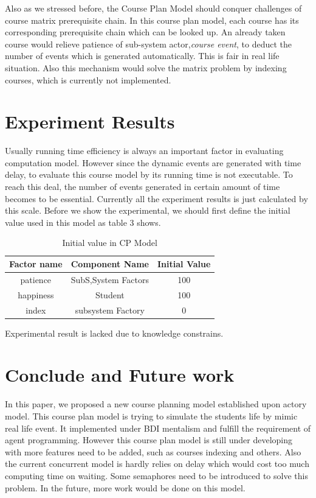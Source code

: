 \documentclass{sig-alternate}
\begin{document}
Also as we stressed before, the Course Plan Model should conquer challenges of course matrix prerequisite chain.  In this course plan model,  each course has its corresponding prerequisite chain which can be looked up. An already taken course would relieve patience of sub-system actor,{\em course event}, to deduct the number of events which is generated automatically.  This is fair in real life situation.  Also this mechanism would solve the matrix problem by indexing courses, which is currently not implemented. \\ 

\section{Experiment Results}
Usually running time efficiency is always an important factor in evaluating computation model. However since the dynamic events are generated with time delay, to evaluate this course model by its running time is not executable.  To reach this deal, the number of events generated in certain amount of time becomes to be essential.   Currently all the experiment results is just calculated by this scale.  Before we show the experimental, we should first define the initial value used in this model as table 3 shows.
\begin{table}[h]
\centering
\caption{Initial value in CP Model }
\begin{tabular}{|c|c|c|}\hline
Factor name & Component Name & Initial Value \\
\hline
patience & SubS,System Factors & 100\\
\hline
happiness & Student &100\\
\hline
index & subsystem Factory &0\\
\hline
\end{tabular}
\end{table}


{\secit Experimental  result is lacked due to knowledge constrains.}


\section{Conclude and Future work}
In this paper, we proposed a new course planning model established upon actory model.  This course plan model is trying to simulate the students life by mimic real life event.  It implemented under BDI mentalism and fulfill the requirement of agent programming. However 
this course plan model is still under developing with more features need to be added, such as courses indexing and others.   Also the current concurrent model is hardly relies on delay which would cost too much computing time on waiting. Some semaphores need to be introduced to solve this problem.  In the future, more work would be done on this model.  



\end{document}
